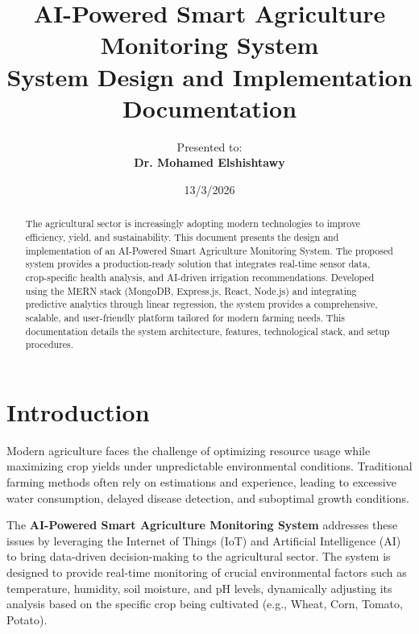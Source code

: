 \documentclass[12pt,a4paper]{article}
\title{\textbf{AI-Powered Smart Agriculture Monitoring System}\\ \Large System Design and Implementation Documentation}
\author{Presented to:\\ \textbf{Dr. Mohamed Elshishtawy}}
\date{13/3/2026}
\begin{document}
\maketitle

\vspace{2cm}

\begin{abstract}
\noindent 
The agricultural sector is increasingly adopting modern technologies to improve efficiency, yield, and sustainability. This document presents the design and implementation of an AI-Powered Smart Agriculture Monitoring System. The proposed system provides a production-ready solution that integrates real-time sensor data, crop-specific health analysis, and AI-driven irrigation recommendations. Developed using the MERN stack (MongoDB, Express.js, React, Node.js) and integrating predictive analytics through linear regression, the system provides a comprehensive, scalable, and user-friendly platform tailored for modern farming needs. This documentation details the system architecture, features, technological stack, and setup procedures.
\end{abstract}

\newpage

\tableofcontents

\newpage

\section{Introduction}
Modern agriculture faces the challenge of optimizing resource usage while maximizing crop yields under unpredictable environmental conditions. Traditional farming methods often rely on estimations and experience, leading to excessive water consumption, delayed disease detection, and suboptimal growth conditions.

The \textbf{AI-Powered Smart Agriculture Monitoring System} addresses these issues by leveraging the Internet of Things (IoT) and Artificial Intelligence (AI) to bring data-driven decision-making to the agricultural sector. The system is designed to provide real-time monitoring of crucial environmental factors such as temperature, humidity, soil moisture, and pH levels, dynamically adjusting its analysis based on the specific crop being cultivated (e.g., Wheat, Corn, Tomato, Potato).
\end{document}
